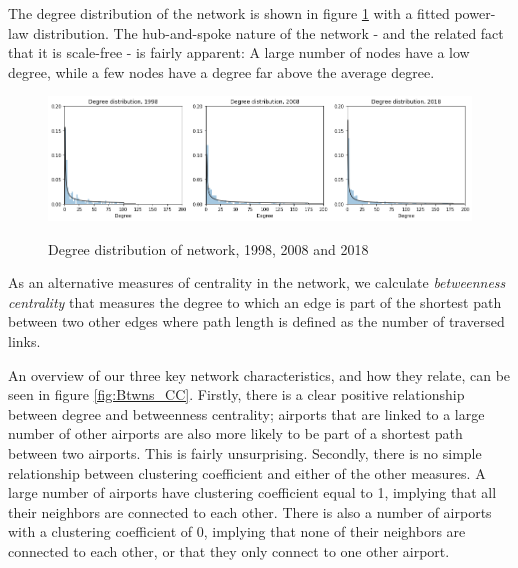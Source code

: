 \noindent
The degree distribution of the network is shown in figure \ref{fig:degree_distribution} with a fitted power-law distribution. The hub-and-spoke nature of the network - and the related fact that it is scale-free - is fairly apparent: A large number of nodes have a low degree, while a few nodes have a degree far above the average degree. 
\begin{figure}[H]
  \centering
  \caption{Degree distribution of network, 1998, 2008 and 2018}
    \includegraphics[width=1 \textwidth]{Exam/Figures/degree_distributionv2.png}
  \label{fig:degree_distribution}
\end{figure}
\noindent
As an alternative measures of centrality in the network, we calculate \textit{betweenness centrality} that measures the degree to which an edge is part of the shortest path between two other edges where path length is defined as the number of traversed links.
\par
An overview of our three key network characteristics, and how they relate, can be seen in figure \ref{fig:Btwns_CC}. Firstly, there is a clear positive relationship between degree and betweenness centrality; airports that are linked to a large number of other airports are also more likely to be part of a shortest path between two airports. This is fairly unsurprising. Secondly, there is no simple relationship between clustering coefficient and either of the other measures. A large number of airports have clustering coefficient equal to 1, implying that all their neighbors are connected to each other. There is also a number of airports with a clustering coefficient of 0, implying that none of their neighbors are connected to each other, or that they only connect to one other airport. 
